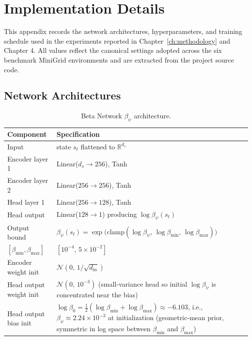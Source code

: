 \chapter{Implementation Details}
\label{app:implementation}

This appendix records the network architectures, hyperparameters, and training schedule used in the experiments reported in Chapter~\ref{ch:methodology} and Chapter 4. All values reflect the canonical settings adopted across the six benchmark MiniGrid environments and are extracted from the project source code.

\section{Network Architectures}
\label{app:architectures}

\begin{table}[H]
\centering
\caption{Beta Network $\beta_\psi$ architecture.}
\label{tab:beta_arch}
\begin{tabular}{|l|p{10.5cm}|}
\hline
\textbf{Component} & \textbf{Specification} \\
\hline
Input & state $s_t$ flattened to $\mathbb{R}^{d_s}$ \\
\hline
Encoder layer 1 & Linear($d_s \to 256$), Tanh \\
\hline
Encoder layer 2 & Linear($256 \to 256$), Tanh \\
\hline
Head layer 1 & Linear($256 \to 128$), Tanh \\
\hline
Head output & Linear($128 \to 1$) producing $\log \beta_\psi(s_t)$ \\
\hline
Output bound & $\beta_\psi(s_t) = \exp\!\bigl( \mathrm{clamp}(\log \beta_\psi,\, \log \beta_\text{min},\, \log \beta_\text{max}) \bigr)$ \\
\hline
$[\beta_\text{min}, \beta_\text{max}]$ & $[10^{-4},\, 5\times 10^{-2}]$ \\
\hline
Encoder weight init & $\mathcal{N}(0,\, 1/\sqrt{d_\text{in}})$ \\
\hline
Head output weight init & $\mathcal{N}(0,\, 10^{-3})$ (small-variance head so initial $\log \beta_\psi$ is concentrated near the bias) \\
\hline
Head output bias init & $\log \beta_0 = \tfrac{1}{2}(\log \beta_\text{min} + \log \beta_\text{max}) \approx -6.103$, i.e., $\beta_\psi \approx 2.24 \times 10^{-3}$ at initialization (geometric-mean prior, symmetric in log space between $\beta_\text{min}$ and $\beta_\text{max}$) \\
\hline
\end{tabular}
\end{table}

